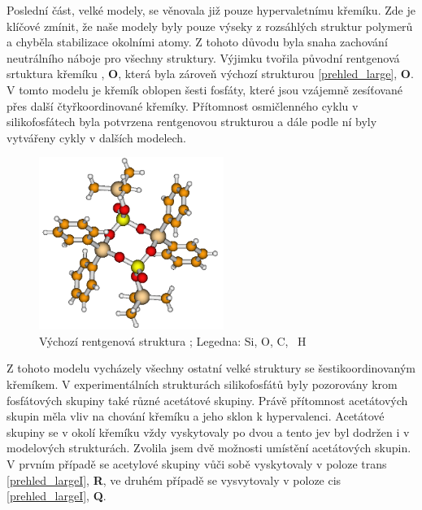 \documentclass[
  digital, %
  table,   %
  lof,     %
  lot,     %
  oneside,
]{fithesis3}
\begin{document}
Poslední část, velké modely, se věnovala již pouze hypervaletnímu křemíku. Zde je klíčové zmínit, že naše modely byly pouze výseky z rozsáhlých struktur polymerů a chyběla stabilizace okolními atomy. Z tohoto důvodu byla snaha zachování neutrálního náboje pro všechny struktury. Výjimku tvořila původní rentgenová srtuktura křemíku \cite{C3NJ00721A}, \textbf{O}, která byla zároveň výchozí strukturou \ref{prehled_large}, \textbf{O}.
V tomto modelu je křemík oblopen šesti fosfáty, které jsou vzájemně zesíťované přes další čtyřkoordinované křemíky. Přítomnost osmičlenného cyklu v silikofosfátech byla potvrzena rentgenovou strukturou \cite{rtg_4_pinkas} a dále podle ní byly vytvářeny cykly v dalších modelech.
\begin{figure}
\begin{center}
\includegraphics[width=6cm]{rtg_4_kruh_samotne.png}
\caption{Výchozí rentgenová struktura \cite{rtg_4_pinkas};  Legedna:  Si,  O,  C, ~H}
\label{rtg_4}
\end{center}
\end{figure}
Z tohoto modelu vycházely všechny ostatní velké struktury se šestikoordinovaným křemíkem. V experimentálních strukturách silikofosfátů byly pozorovány krom fosfátových skupiny také různé acetátové skupiny. Právě přítomnost acetátových skupin měla vliv na chování křemíku a jeho sklon k hypervalenci. Acetátové skupiny se  v okolí křemíku vždy vyskytovaly po dvou a tento jev byl dodržen i v modelových strukturách. Zvolila jsem dvě možnosti umístění acetátových skupin. V prvním případě se acetylové skupiny vůči sobě vyskytovaly v poloze trans \ref{prehled_largeI},  \textbf{R}, ve druhém případě se vysvytovaly v poloze cis \ref{prehled_largeI},  \textbf{Q}.
\end{document}
